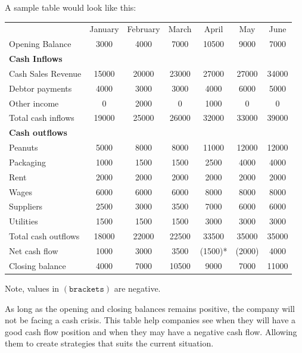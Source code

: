 \documentclass{standalone}
\begin{document}
A sample table would look like this:
\begin{tabular}{l c c c c c c}
                             & January & February & March & April   & May    & June \\
    Opening Balance          & 3000    & 4000     & 7000  & 10500   & 9000   & 7000 \\
    \hline
    \textbf{Cash Inflows}    &         &          &       &         &        & \\
    Cash Sales Revenue       & 15000   & 20000    & 23000 & 27000   & 27000  & 34000 \\
    Debtor payments          & 4000    & 3000     & 3000  & 4000    & 6000   & 5000 \\
    Other income             & 0       & 2000     & 0     & 1000    & 0      & 0 \\
    Total cash inflows       & 19000   & 25000    & 26000 & 32000   & 33000  & 39000 \\
    \hline
    \textbf{Cash outflows}   &         &          &       &         &        & \\
    Peanuts                  & 5000    & 8000     & 8000  & 11000   & 12000  & 12000 \\
    Packaging                & 1000    & 1500     & 1500  & 2500    & 4000   & 4000 \\
    Rent                     & 2000    & 2000     & 2000  & 2000    & 2000   & 2000 \\
    Wages                    & 6000    & 6000     & 6000  & 8000    & 8000   & 8000 \\
    Suppliers                & 2500    & 3000     & 3500  & 7000    & 6000   & 6000 \\
    Utilities                & 1500    & 1500     & 1500  & 3000    & 3000   & 3000 \\
    \hline
    Total cash outflows      & 18000   & 22000    & 22500 & 33500   & 35000  & 35000 \\
    Net cash flow            & 1000    & 3000     & 3500  & (1500)* & (2000) & 4000 \\
    Closing balance          & 4000    & 7000     & 10500 & 9000    & 7000   & 11000
\end{tabular}

Note, values in $(\texttt{brackets})$ are negative.

As long as the opening and closing balances remains positive, the company will not be facing a cash crisis.
This table help companies see when they will have a good cash flow position and when they may have a negative cash flow.
Allowing them to create strategies that suits the current situation.
\end{document}
